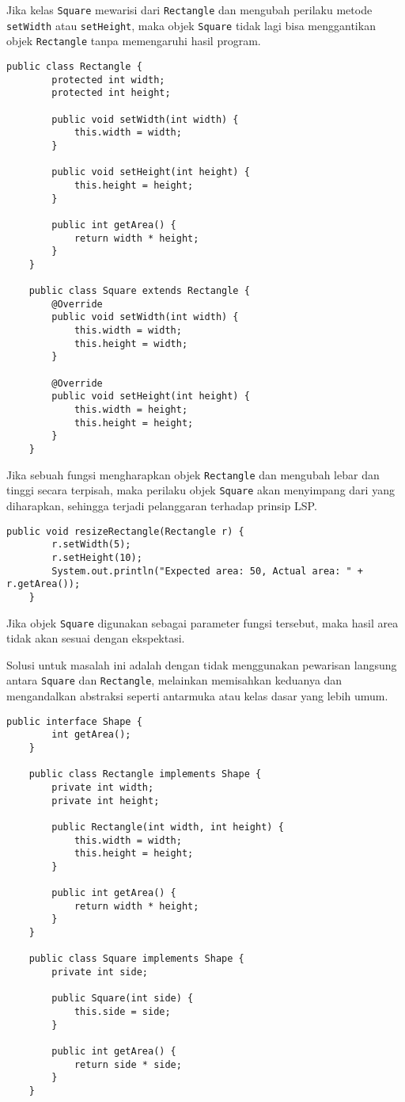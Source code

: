 Jika kelas \texttt{Square} mewarisi dari \texttt{Rectangle} dan mengubah perilaku metode \texttt{setWidth} atau \texttt{setHeight}, maka objek \texttt{Square} tidak lagi bisa menggantikan objek \texttt{Rectangle} tanpa memengaruhi hasil program.

\begin{lstlisting}[style=JavaStyle, caption={Contoh pelanggaran LSP}]
	public class Rectangle {
		protected int width;
		protected int height;
		
		public void setWidth(int width) {
			this.width = width;
		}
		
		public void setHeight(int height) {
			this.height = height;
		}
		
		public int getArea() {
			return width * height;
		}
	}
	
	public class Square extends Rectangle {
		@Override
		public void setWidth(int width) {
			this.width = width;
			this.height = width;
		}
		
		@Override
		public void setHeight(int height) {
			this.width = height;
			this.height = height;
		}
	}
\end{lstlisting}

Jika sebuah fungsi mengharapkan objek \texttt{Rectangle} dan mengubah lebar dan tinggi secara terpisah, maka perilaku objek \texttt{Square} akan menyimpang dari yang diharapkan, sehingga terjadi pelanggaran terhadap prinsip LSP.

\begin{lstlisting}[style=JavaStyle, caption={Fungsi yang melanggar substitusi LSP}]
	public void resizeRectangle(Rectangle r) {
		r.setWidth(5);
		r.setHeight(10);
		System.out.println("Expected area: 50, Actual area: " + r.getArea());
	}
\end{lstlisting}

Jika objek \texttt{Square} digunakan sebagai parameter fungsi tersebut, maka hasil area tidak akan sesuai dengan ekspektasi.

Solusi untuk masalah ini adalah dengan tidak menggunakan pewarisan langsung antara \texttt{Square} dan \texttt{Rectangle}, melainkan memisahkan keduanya dan mengandalkan abstraksi seperti antarmuka atau kelas dasar yang lebih umum.

\begin{lstlisting}[style=JavaStyle, caption={Refaktor: hindari pewarisan langsung}]
	public interface Shape {
		int getArea();
	}
	
	public class Rectangle implements Shape {
		private int width;
		private int height;
		
		public Rectangle(int width, int height) {
			this.width = width;
			this.height = height;
		}
		
		public int getArea() {
			return width * height;
		}
	}
	
	public class Square implements Shape {
		private int side;
		
		public Square(int side) {
			this.side = side;
		}
		
		public int getArea() {
			return side * side;
		}
	}
\end{lstlisting}

